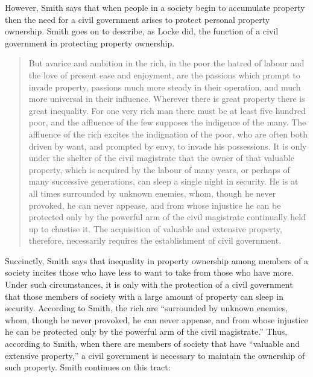 However, Smith says that when people in a society begin to accumulate property then the need for a civil government arises to protect personal property ownership.  Smith goes on to describe, as Locke did, the function of a civil government in protecting property ownership.  

\begin{quote}
But avarice and ambition in the rich, in the poor the hatred of labour and the love of present ease and enjoyment, are the passions which prompt to invade property, passions much more steady in their operation, and much more universal in their influence.  Wherever there is great property there is great inequality. For one very rich man there must be at least five hundred poor, and the affluence of the few supposes the indigence of the many. The affluence of the rich excites the indignation of the poor, who are often both driven by want, and prompted by envy, to invade his possessions. It is only under the shelter of the civil magistrate that the owner of that valuable property, which is acquired by the labour of many years, or perhaps of many successive generations, can sleep a single night in security. He is at all times surrounded by unknown enemies, whom, though he never provoked, he can never appease, and from whose injustice he can be protected only by the powerful arm of the civil magistrate continually held up to chastise it. 
The acquisition of valuable and extensive property, therefore, necessarily requires the establishment of civil government.  
\end{quote}

Succinctly, Smith says that inequality in property ownership among members of a society incites those who have less to want to take from those who have more.  Under such circumstances, it is only with the protection of a civil government that those members of society with a large amount of property can sleep in security.  According to Smith, the rich are ``surrounded by unknown enemies, whom, though he never provoked, he can never appease, and from whose injustice he can be protected only by the powerful arm of the civil magistrate.''  Thus, according to Smith, when there are members of society that have ``valuable and extensive property,'' a civil government is necessary to maintain the ownership of such property.  Smith continues on this tract:

